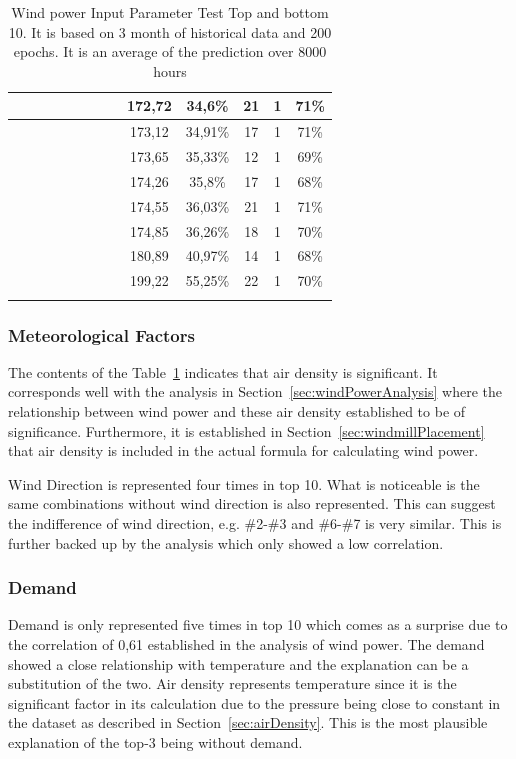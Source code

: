 \begin{center}
\begin{longtable}{|c|c|c|c|c|c|c|c|c|c|c|c|c|}
 \x &  &  \x &  \x &  &  \x &  \x &  & 172,72 & 34,6\% & 21 & 1 & 71\% \\ \hline
 \x &  &  &  &  \x &  \x &  \x &  & 173,12 & 34,91\% & 17 & 1 & 71\% \\ \hline
 \x &  &  \x &  \x &  &  \x &  \x &  \x & 173,65 & 35,33\% & 12 & 1 & 69\% \\ \hline
 \x &  \x &  \x &  \x &  \x &  \x &  \x &  \x & 174,26 & 35,8\% & 17 & 1 & 68\% \\ \hline
 \x &  \x &  &  \x &  &  \x &  \x &  \x & 174,55 & 36,03\% & 21 & 1 & 71\% \\ \hline
 \x &  &  &  \x &  &  \x &  \x &  \x & 174,85 & 36,26\% & 18 & 1 & 70\% \\ \hline
 \x &  \x &  \x &  &  \x &  \x &  \x &  & 180,89 & 40,97\% & 14 & 1 & 68\% \\ \hline
 \x &  \x &  &  &  \x &  \x &  \x &  \x & 199,22 & 55,25\% & 22 & 1 & 70\% \\ \hline
\caption{Wind power Input Parameter Test Top and bottom 10. It is based on 3 month of historical data and 200 epochs. It is an average of the prediction over 8000 hours}
\label{table:windProdInputParamsTop10}
\end{longtable}
\end{center}
\normalsize

\subsubsection{Meteorological Factors}
The contents of the Table~\ref{table:windProdInputParamsTop10} indicates that air density is significant. It corresponds well with the analysis in Section~\ref{sec:windPowerAnalysis} where the relationship between wind power and these air density established to be of significance. Furthermore, it is established in Section~\ref{sec:windmillPlacement} that air density is included in the actual formula for calculating wind power.

Wind Direction is represented four times in top 10. What is noticeable is the same combinations without wind direction is also represented. This can suggest the indifference of wind direction, e.g. \#2-\#3 and \#6-\#7 is very similar. This is further backed up by the analysis which only showed a low correlation.

\subsubsection{Demand}
Demand is only represented five times in top 10 which comes as a surprise due to the correlation of 0,61 established in the analysis of wind power. The demand showed a close relationship with temperature and the explanation can be a substitution of the two. Air density represents temperature since it is the significant factor in its calculation due to the pressure being close to constant in the dataset as described in Section~\ref{sec:airDensity}. This is the most plausible explanation of the top-3 being without demand.

